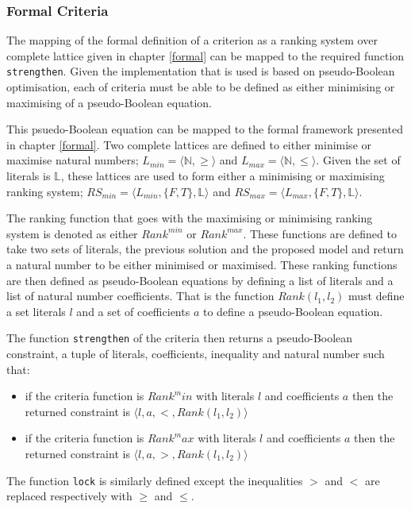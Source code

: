\subsubsection{Formal Criteria}
\label{impl.formalcrit}
The mapping of the formal definition of a criterion as a ranking system over complete lattice given in chapter \ref{formal} can be mapped to the required function \verb+strengthen+.
Given the implementation that is used is based on pseudo-Boolean optimisation, 
each of criteria must be able to be defined as either minimising or maximising of a pseudo-Boolean equation.

This psuedo-Boolean equation can be mapped to the formal framework presented in chapter \ref{formal}.
Two complete lattices are defined to either minimise or maximise natural numbers; $L_{min} = \langle \mathbb{N}, \geq \rangle$ and $L_{max} = \langle \mathbb{N}, \leq \rangle$.
Given the set of literals is $\mathbb{L}$, these lattices are used to form either a minimising or maximising  ranking system;
$RS_{min} = \langle L_{min}, \{F,T\}, \mathbb{L} \rangle$ and $RS_{max} = \langle L_{max}, \{F,T\}, \mathbb{L} \rangle$. 

The ranking function that goes with the maximising or minimising ranking system is denoted as either $Rank^{min}$ or $Rank^{max}$.
These functions are defined to take two sets of literals, the previous solution and the proposed model and return a natural number to be either minimised or maximised.
These ranking functions are then defined as pseudo-Boolean equations by defining a list of literals and a list of natural number coefficients.
That is the function $Rank(l_1,l_2)$ must define a set literals $l$ and a set of coefficients $a$ to define a pseudo-Boolean equation. 

The function \verb+strengthen+ of the criteria then returns a pseudo-Boolean constraint, a tuple of literals, coefficients, inequality and natural number such that:
\begin{itemize}
  \item if the criteria function is $Rank^min$ with literals $l$ and coefficients $a$ then the returned constraint is $\langle l,a,<,Rank(l_1,l_2)\rangle$
  \item if the criteria function is $Rank^max$ with literals $l$ and coefficients $a$ then the returned constraint is $\langle l,a,>,Rank(l_1,l_2)\rangle$
\end{itemize}
The function \verb+lock+ is similarly defined except the inequalities $>$ and $<$ are replaced respectively with $\geq$ and $\leq$.

